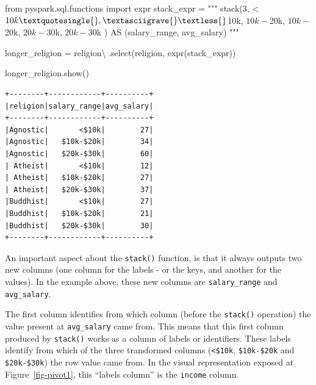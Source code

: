\documentclass[
  11pt,
  letterpaper,
  DIV=11,
  numbers=noendperiod]{scrreprt}
\newenvironment{Shaded}{\begin{snugshade}}{\end{snugshade}}
\newcommand{\ImportTok}[1]{\textcolor[rgb]{0.00,0.46,0.62}{#1}}
\newcommand{\NormalTok}[1]{\textcolor[rgb]{0.00,0.23,0.31}{#1}}
\newcommand{\OperatorTok}[1]{\textcolor[rgb]{0.37,0.37,0.37}{#1}}
\newcommand{\StringTok}[1]{\textcolor[rgb]{0.13,0.47,0.30}{#1}}
\begin{document}
\begin{Shaded}
\begin{Highlighting}[]
\ImportTok{from}\NormalTok{ pyspark.sql.functions }\ImportTok{import}\NormalTok{ expr}
\NormalTok{stack\_expr }\OperatorTok{=} \StringTok{"""}
\StringTok{stack(3,}
\StringTok{    \textquotesingle{}\textless{}$10k\textquotesingle{}, \textasciigrave{}\textless{}$10k\textasciigrave{},}
\StringTok{    \textquotesingle{}$10k{-}$20k\textquotesingle{}, \textasciigrave{}$10k{-}$20k\textasciigrave{},}
\StringTok{    \textquotesingle{}$20k{-}$30k\textquotesingle{}, \textasciigrave{}$20k{-}$30k\textasciigrave{}}
\StringTok{) AS (salary\_range, avg\_salary)}
\StringTok{"""}

\NormalTok{longer\_religion }\OperatorTok{=}\NormalTok{ religion}\OperatorTok{\textbackslash{}}
\NormalTok{    .select(}\StringTok{\textquotesingle{}religion\textquotesingle{}}\NormalTok{, expr(stack\_expr))}

\NormalTok{longer\_religion.show()}
\end{Highlighting}
\end{Shaded}

\begin{verbatim}
+--------+------------+----------+
|religion|salary_range|avg_salary|
+--------+------------+----------+
|Agnostic|       <$10k|        27|
|Agnostic|   $10k-$20k|        34|
|Agnostic|   $20k-$30k|        60|
| Atheist|       <$10k|        12|
| Atheist|   $10k-$20k|        27|
| Atheist|   $20k-$30k|        37|
|Buddhist|       <$10k|        27|
|Buddhist|   $10k-$20k|        21|
|Buddhist|   $20k-$30k|        30|
+--------+------------+----------+
\end{verbatim}

An important aspect about the \texttt{stack()} function, is that it
always outputs two new columns (one column for the labels - or the keys,
and another for the values). In the example above, these new columns are
\texttt{salary\_range} and \texttt{avg\_salary}.

The first column identifies from which column (before the
\texttt{stack()} operation) the value present at \texttt{avg\_salary}
came from. This means that this first column produced by
\texttt{stack()} works as a column of labels or identifiers. These
labels identify from which of the three transformed columns
(\texttt{\textless{}\$10k}, \texttt{\$10k-\$20k} and
\texttt{\$20k-\$30k}) the row value came from. In the visual
representation exposed at Figure~\ref{fig-pivot1}, this ``labels
column'' is the \texttt{income} column.
\end{document}
